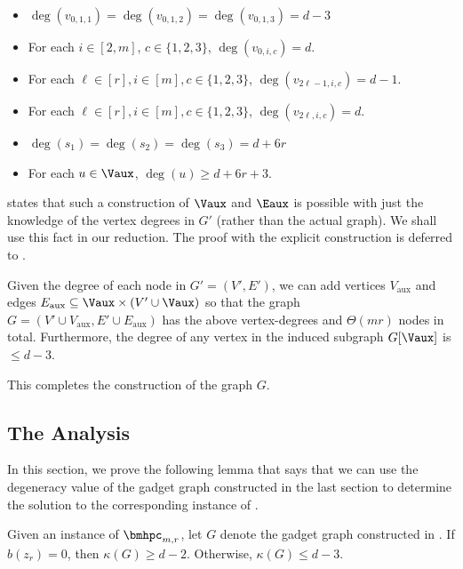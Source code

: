 \begin{itemize}
    \item $\deg(v_{0,1,1})= \deg(v_{0,1,2}) = \deg(v_{0,1,3}) = d-3$ 
   \item For each $i\in [2,m]$, $c\in\{1,2,3\}$, $\deg(v_{0,i,c})=d$.
   \item For each $\ell\in [r], i\in [m], c\in \{1,2,3\}$, $\deg(v_{2\ell-1,i,c})=d-1$.
    \item For each $\ell\in [r], i\in [m], c\in \{1,2,3\}$, $\deg(v_{2\ell,i,c})=d$.
    \item $\deg(s_1)=\deg(s_2)=\deg(s_3)=d+6r$
    \item For each $u\in \Vaux$, $\deg(u)\geq d+6r+3$. 
\end{itemize}

 states that such a construction of $\Vaux$ and $\Eaux$ is possible with just the knowledge of the vertex degrees in $G'$ (rather than the actual graph). We shall use this fact in our reduction. The proof with the explicit construction is deferred to .

\begin{lemma}\label{lem:redn-aux-constr}
 Given the degree of each node in $G'=(V',E')$, we can add vertices $V_{\text{aux}}$ and edges $E_{\text{aux}}\subseteq \Vaux \times (V'\cup \Vaux)$ so that the graph $G=\left(V' \cup V_{\text{aux}}, E' \cup E_{\text{aux}}\right)$ has the above vertex-degrees and $\Theta(mr)$ nodes in total. Furthermore, the degree of any vertex in the induced subgraph $G[\Vaux]$ is $\leq d-3$.
\end{lemma}



This completes the construction of the graph $G$. 

\subsection{The Analysis}

In this section, we prove the following lemma that says that we can use the degeneracy value of the gadget graph constructed in the last section to determine the solution to the corresponding instance of \bmhpc. 

\begin{lemma}\label{lem:redn-degen-yesno}
     Given an instance of $\bmhpc_{m,r}$, let $G$ denote the gadget graph constructed in . If $b(z_r)=0$, then $\kappa(G)\geq d-2$. Otherwise, $\kappa(G)\leq d-3$.
\end{lemma}

